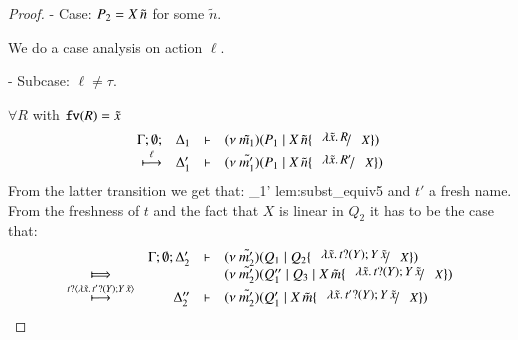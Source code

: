 \begin{proof}
	\noi - Case: $P_2 = X\,\tilde{n}$ for some $\tilde{n}$.

	\noi We do a case analysis on action $\ell$.

	\noi - Subcase: $\ell \not= \tau$.

	\noi $\forall R$ with $\mathtt{fv}(R) = \tilde{x}$
%
	\[
		\mhorel{\Gamma}{\Delta_1}{\newsp{\tilde{m_1}}{P_1 \Par \appl{X}{\tilde{n}} \subst{\abs{\tilde{x}}{R}}{X}}}
		{\hby{\ell}}
		{\Delta_1'}{}{\newsp{\tilde{m_1'}}{P_1 \Par \appl{X}{\tilde{n}} \subst{\abs{\tilde{x}}{R'}}{X}}}
	\]
%
	\noi From the latter transition we get that:
%
	{}
	{\Delta_1'}{}
	{lem:subst_equiv5}
%
%
	\noi and $t'$ a fresh name. From the freshness of $t$ and the fact that $X$ is linear in $Q_2$
	it has to be the case that:
%
	\[
		\begin{array}{crll}
			&\Gamma; \es; \Delta_2'& \proves &
			\newsp{\tilde{m_2'}}{Q_1 \Par Q_2 \subst{\abs{\tilde{x}}{\binp{t}{Y} \appl{Y}{\tilde{x}}}}{X}}\\
			\Hby{} & & &
			\newsp{\tilde{m_2'}}{Q_1'' \Par Q_3 \Par \appl{X}{\tilde{m}} \subst{\abs{\tilde{x}}{\binp{t}{Y} \appl{Y}{\tilde{x}}}}{X}} \\
			\hby{\bactinp{t}{\abs{\tilde{x}}{\binp{t'}{Y} \appl{Y}{\tilde{x}}}}}
			& \Delta_2''& \proves& \newsp{\tilde{m_2'}}{Q_1' \Par \appl{X}{\tilde{m}} \subst{\abs{\tilde{x}}{\binp{t'}{Y} \appl{Y}{\tilde{x}}}}{X}}
		\end{array}
	\]
%
%

\end{proof}
